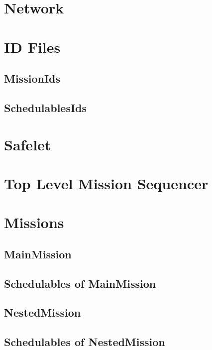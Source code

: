 \documentclass[10pt,a4paper]{article}
\begin{document}
\section{Network}

\newpage

\section{ID Files}
\subsection{MissionIds}


\subsection{SchedulablesIds}

\newpage

\section{Safelet}

\newpage

\section{Top Level Mission Sequencer}

\newpage

\section{Missions}


\subsection{MainMission}

\newpage

\subsection{Schedulables of MainMission}



\subsection{NestedMission}

\newpage

\subsection{Schedulables of NestedMission}


\end{document}
